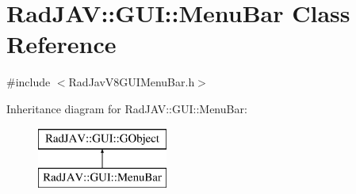\hypertarget{class_rad_j_a_v_1_1_g_u_i_1_1_menu_bar}{}\section{Rad\+J\+AV\+:\+:G\+UI\+:\+:Menu\+Bar Class Reference}
\label{class_rad_j_a_v_1_1_g_u_i_1_1_menu_bar}


{\ttfamily \#include $<$Rad\+Jav\+V8\+G\+U\+I\+Menu\+Bar.\+h$>$}

Inheritance diagram for Rad\+J\+AV\+:\+:G\+UI\+:\+:Menu\+Bar\+:\begin{figure}[H]
\begin{center}
\leavevmode
\includegraphics[height=2.000000cm]{class_rad_j_a_v_1_1_g_u_i_1_1_menu_bar}
\end{center}
\end{figure}
